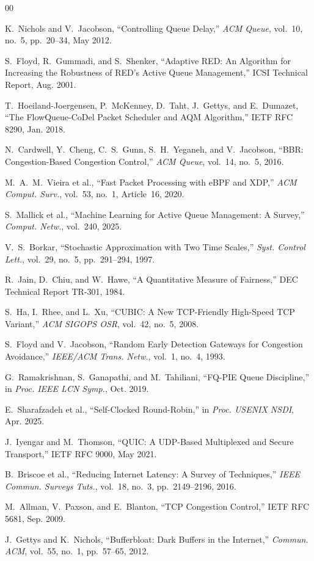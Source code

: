 \documentclass[conference]{IEEEtran}
\begin{document}
\begin{thebibliography}{00}

K.~Nichols and V.~Jacobson, ``Controlling Queue Delay,''
\textit{ACM Queue}, vol.~10, no.~5, pp.~20--34, May 2012.

S.~Floyd, R.~Gummadi, and S.~Shenker, ``Adaptive RED: An Algorithm for
Increasing the Robustness of RED's Active Queue Management,''
ICSI Technical Report, Aug. 2001.

T.~Hoeiland-Joergensen, P.~McKenney, D.~Taht, J.~Gettys, and E.~Dumazet,
``The FlowQueue-CoDel Packet Scheduler and AQM Algorithm,''
IETF RFC 8290, Jan. 2018.

N.~Cardwell, Y.~Cheng, C.~S.~Gunn, S.~H.~Yeganeh, and V.~Jacobson,
``BBR: Congestion-Based Congestion Control,''
\textit{ACM Queue}, vol.~14, no.~5, 2016.

M.~A.~M.~Vieira et al., ``Fast Packet Processing with eBPF and XDP,''
\textit{ACM Comput. Surv.}, vol.~53, no.~1, Article~16, 2020.

S.~Mallick et al., ``Machine Learning for Active Queue Management: A Survey,''
\textit{Comput. Netw.}, vol.~240, 2025.

V.~S.~Borkar, ``Stochastic Approximation with Two Time Scales,''
\textit{Syst. Control Lett.}, vol.~29, no.~5, pp.~291--294, 1997.

R.~Jain, D.~Chiu, and W.~Hawe, ``A Quantitative Measure of Fairness,''
DEC Technical Report TR-301, 1984.

S.~Ha, I.~Rhee, and L.~Xu, ``CUBIC: A New TCP-Friendly High-Speed TCP
Variant,'' \textit{ACM SIGOPS OSR}, vol.~42, no.~5, 2008.

S.~Floyd and V.~Jacobson, ``Random Early Detection Gateways for Congestion
Avoidance,'' \textit{IEEE/ACM Trans. Netw.}, vol.~1, no.~4, 1993.

G.~Ramakrishnan, S.~Ganapathi, and M.~Tahiliani, ``FQ-PIE Queue Discipline,''
in \textit{Proc. IEEE LCN Symp.}, Oct. 2019.

E.~Sharafzadeh et al., ``Self-Clocked Round-Robin,''
in \textit{Proc. USENIX NSDI}, Apr. 2025.

J.~Iyengar and M.~Thomson, ``QUIC: A UDP-Based Multiplexed and Secure
Transport,'' IETF RFC 9000, May 2021.

B.~Briscoe et al., ``Reducing Internet Latency: A Survey of Techniques,''
\textit{IEEE Commun. Surveys Tuts.}, vol.~18, no.~3, pp.~2149--2196, 2016.

M.~Allman, V.~Paxson, and E.~Blanton, ``TCP Congestion Control,''
IETF RFC 5681, Sep. 2009.

J.~Gettys and K.~Nichols, ``Bufferbloat: Dark Buffers in the Internet,''
\textit{Commun. ACM}, vol.~55, no.~1, pp.~57--65, 2012.

\end{thebibliography}
\end{document}
